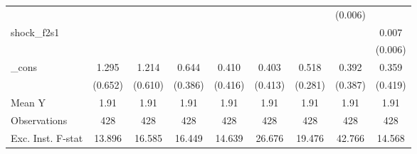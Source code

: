 {\begin{tabular}{l*{8}{c}}
            &                     &                     &                     &                     &                     &                     &     (0.006)         &                     \\
\addlinespace
shock\_f2s1  &                     &                     &                     &                     &                     &                     &                     &       0.007         \\
            &                     &                     &                     &                     &                     &                     &                     &     (0.006)         \\
\addlinespace
\_cons      &       1.295\sym{*}  &       1.214\sym{*}  &       0.644         &       0.410         &       0.403         &       0.518\sym{*}  &       0.392         &       0.359         \\
            &     (0.652)         &     (0.610)         &     (0.386)         &     (0.416)         &     (0.413)         &     (0.281)         &     (0.387)         &     (0.419)         \\
\midrule
Mean Y      &        1.91         &        1.91         &        1.91         &        1.91         &        1.91         &        1.91         &        1.91         &        1.91         \\
Observations&         428         &         428         &         428         &         428         &         428         &         428         &         428         &         428         \\
Exc. Inst. F-stat&      13.896         &      16.585         &      16.449         &      14.639         &      26.676         &      19.476         &      42.766         &      14.568         \\
\bottomrule
\end{tabular}
}
